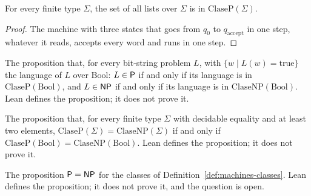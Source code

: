 \begin{theorem}
  \label{thm:machines-cook-total}
  \leanok
  For every finite type $\Sigma$, the set of all lists over $\Sigma$ is in $\mathrm{ClaseP}(\Sigma)$.
\end{theorem}

\begin{proof}
  \leanok
  The machine with three states that goes from $q_0$ to $q_{\mathrm{accept}}$ in one step, whatever it reads,
  accepts every word and runs in one step.
\end{proof}

\begin{definition}
  \label{def:machines-hyp-models}
  \leanok
  The proposition that, for every bit-string problem $L$, with $\{w \mid L(w) = \mathrm{true}\}$ the language
  of $L$ over $\mathrm{Bool}$: $L \in \mathsf{P}$ if and only if its language is in $\mathrm{ClaseP}(\mathrm{Bool})$, and
  $L \in \mathsf{NP}$ if and only if its language is in $\mathrm{ClaseNP}(\mathrm{Bool})$.
  Lean defines the proposition; it does not prove it.
  \own{}
\end{definition}

\begin{definition}
  \label{def:machines-hyp-alphabet}
  \leanok
  The proposition that, for every finite type $\Sigma$ with decidable equality and at least two elements,
  $\mathrm{ClaseP}(\Sigma) = \mathrm{ClaseNP}(\Sigma)$ if and only if
  $\mathrm{ClaseP}(\mathrm{Bool}) = \mathrm{ClaseNP}(\mathrm{Bool})$.
  Lean defines the proposition; it does not prove it.
  \own{}
\end{definition}

\begin{definition}[Hypothesis: P = NP, for bit-string problems]
  \label{def:machines-peqnp}
  \leanok
  The proposition $\mathsf{P} = \mathsf{NP}$ for the classes of Definition~\ref{def:machines-classes}.
  Lean defines the proposition; it does not prove it, and the question is open.
  \own{}
\end{definition}

